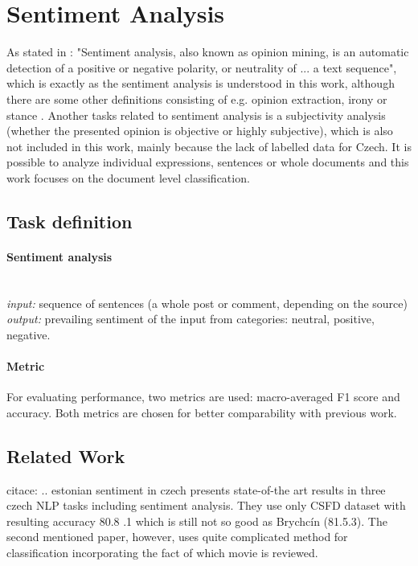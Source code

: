 \section{Sentiment Analysis}
\label{chap:sent}
As stated in \citep{Veselovska}: "Sentiment analysis, also known as opinion mining, is an automatic detection of a positive or negative polarity, or neutrality of ... a text sequence", which is exactly as the sentiment analysis is understood in this work, although there are some other definitions consisting of e.g. opinion extraction, irony or stance \citep{Montoyo2012}. Another tasks related to sentiment analysis is a subjectivity analysis (whether the presented opinion is objective or highly subjective), which is also not included in this work, mainly because the lack of labelled data for Czech. It is possible to analyze individual expressions, sentences or whole documents \citep{Veselovska} and this work focuses on the document level classification.
\subsection{Task definition}
\paragraph{Sentiment analysis} \mbox{}\\
\textit{input:} sequence of sentences (a whole post or comment, depending on the source) \\
\textit{output:} prevailing sentiment of the input from categories: neutral, positive, negative.
\par

\paragraph{Metric} For evaluating performance, two metrics are used: macro-averaged F1 score and accuracy. Both metrics are chosen for better comparability with previous work.

\subsection{Related Work}
citace:
\citep{Cano2019}
\citep{Kittask2020} .. estonian
\citep{Lenc2016} sentiment in czech
\citep{Hercig2018}
\citep{Li}
\citep{Libovicky} presents state-of-the art results in three czech NLP tasks including sentiment analysis. They use only CSFD dataset with resulting accuracy 80.8 .1 which is still not so good as Brychcín (81.5.3). The second mentioned paper, however, uses quite complicated method for classification incorporating the fact of which movie is reviewed. 

